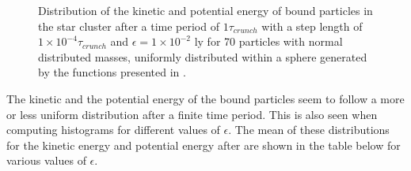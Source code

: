 \begin{figure}[H]
\begin{minipage}{.5\textwidth}
\end{minipage}
\caption{
	Distribution of the kinetic and potential energy of bound particles in the star cluster after a time period of $1\tau_{crunch}$ with a step length of $1\times 10^{-4} \tau_{crunch}$ and $\epsilon = 1\times 10^{-2} \text{ ly}$ for 70 particles with normal distributed masses, uniformly distributed within a sphere generated by the functions presented in . 
}
\label{fig:DistributionPotKinEnBoundHistograms}
\end{figure}
The kinetic and the potential energy of the bound particles seem to follow a more or less uniform distribution after a finite time period. 
This is also seen when computing histograms for different values of $\epsilon$. 
The mean of these distributions for the kinetic energy and potential energy after are shown in the table below for various values of $\epsilon$. 